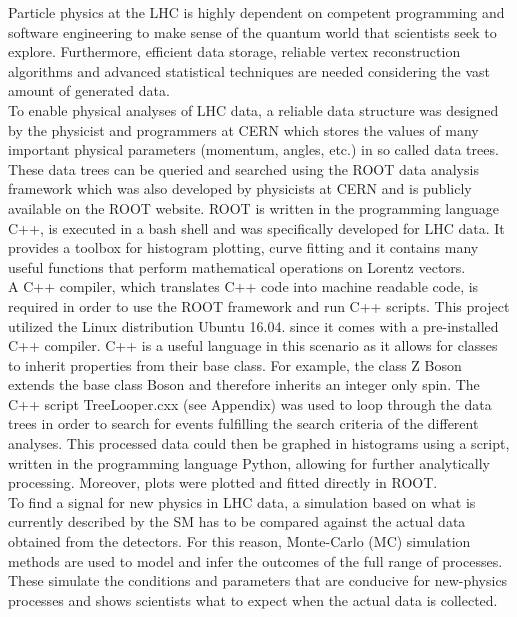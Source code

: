 \documentclass[runningheads,a4paper]{llncs}
\begin{document}
Particle physics at the LHC is highly dependent on competent programming and software engineering to make sense of the quantum world that scientists seek to explore. Furthermore, efficient data storage, reliable vertex reconstruction algorithms and advanced statistical techniques are needed considering the vast amount of generated data.\\

To enable physical analyses of LHC data, a reliable data structure was designed by the physicist and programmers at CERN which stores the values of many important physical parameters (momentum, angles, etc.) in so called data trees. These data trees can be queried and searched using the ROOT data analysis framework which was also developed by physicists at CERN and is publicly available on the ROOT website. ROOT is written in the programming language C++, is executed in a bash shell and was specifically developed for LHC data. It provides a toolbox for histogram plotting, curve fitting and it contains many useful functions that perform mathematical operations on Lorentz vectors.\\

A C++ compiler, which translates C++ code into machine readable code, is required in order to use the ROOT framework and run C++ scripts. This project utilized the Linux distribution Ubuntu 16.04. since it comes with a pre-installed C++ compiler. C++ is a useful language in this scenario as it allows for classes to inherit properties from their base class. For example, the class Z Boson extends the base class Boson and therefore inherits an integer only spin. The C++ script {\selectfont TreeLooper.cxx} (see Appendix) was used to loop through the data trees in order to search for events fulfilling the search criteria of the different analyses. This processed data could then be graphed in histograms using a script, written in the programming language Python, allowing for further analytically processing. Moreover, plots were plotted and fitted directly in ROOT.\\

To find a signal for new physics in LHC data, a simulation based on what is currently described by the SM has to be compared against the actual data obtained from the detectors. For this reason, Monte-Carlo (MC) simulation methods are used to model and infer the outcomes of the full range of processes. These simulate the conditions and parameters that are conducive for new-physics processes and shows scientists what to expect when the actual data is collected.\\
\end{document}

